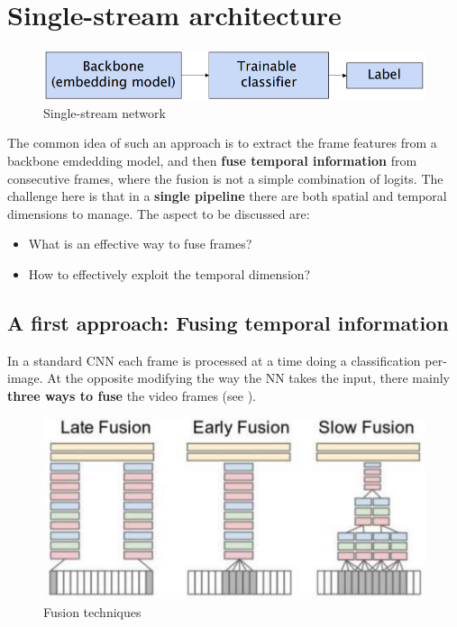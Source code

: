 \section{Single-stream architecture}
\begin{figure}[h]
    \centering
    \includegraphics[scale=0.7]{img/SStream.png}
    \caption{Single-stream network}
\end{figure}
The common idea of such an approach is to extract the frame features from a backbone emdedding model, and then \textbf{fuse temporal information} from consecutive frames, where the fusion is not a simple combination of logits. The challenge here is that in a \textbf{single pipeline} there are both spatial and temporal dimensions to manage. The aspect to be discussed are: 
\begin{itemize}
    \itemsep-0.3em
    \item What is an effective way to fuse frames?
    \item How to effectively exploit the temporal dimension?
\end{itemize} 

\subsection{A first approach: Fusing temporal information}
In a standard CNN each frame is processed at a time doing a classification per-image. At the opposite modifying the way the NN takes the input, there mainly \textbf{three ways to fuse} the video frames (see \cite{karpathy2014large}).

\begin{figure}[h]
    \centering
    \includegraphics[scale=0.8]{img/Fusion.png}
    \caption{Fusion techniques}
    \label{fig:fusion}
\end{figure}

